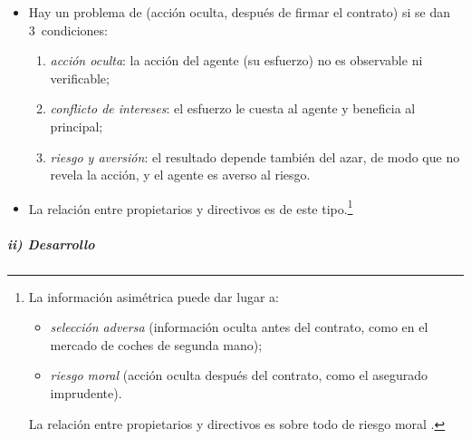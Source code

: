 \documentclass[11pt]{article}
\begin{document}
\begin{itemize}
\item Hay un problema de  (acción oculta, después de firmar el contrato) si se dan 3~condiciones:
  \begin{enumerate}
  \item \emph{acción oculta}: la acción del agente (su esfuerzo) no es observable ni verificable;
  \item \emph{conflicto de intereses}: el esfuerzo le cuesta al agente y beneficia al principal;
  \item \emph{riesgo y aversión}: el resultado depende también del azar, de modo que no revela la acción, y el agente es averso al riesgo.
  \end{enumerate}
\item La relación entre propietarios y directivos es de este tipo.\footnote{La información asimétrica puede dar lugar a:
\begin{itemize}
\item \emph{selección adversa} (información oculta antes del contrato, como en el mercado de coches de segunda mano);
\item \emph{riesgo moral} (acción oculta después del contrato, como el asegurado imprudente).
\end{itemize}
La relación entre propietarios y directivos es sobre todo de riesgo moral .}
\end{itemize}

\subparagraph{ii) Desarrollo}
\end{document}
